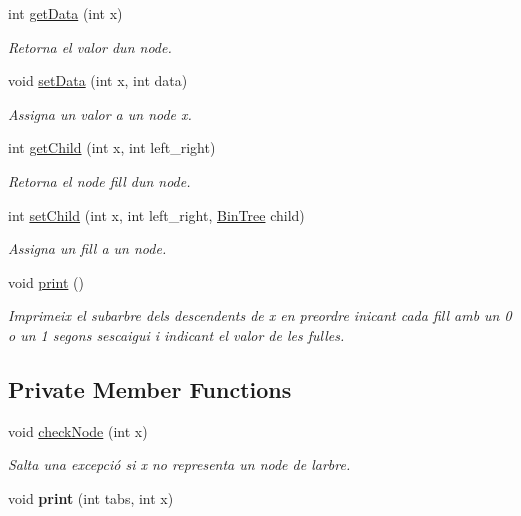\begin{DoxyCompactItemize}
int \hyperlink{classdomini_1_1utils_1_1BinTree_ad8734786aa8ba40815e4b782264aef64}{get\+Data} (int x)
\begin{DoxyCompactList}\small\item\em Retorna el valor d\textquotesingle{}un node. \end{DoxyCompactList}\item 
void \hyperlink{classdomini_1_1utils_1_1BinTree_a785c86fc21b251e2252455ab4ec2b3e1}{set\+Data} (int x, int data)
\begin{DoxyCompactList}\small\item\em Assigna un valor a un node x. \end{DoxyCompactList}\item 
int \hyperlink{classdomini_1_1utils_1_1BinTree_aee1ed36b9433869f94a6ee8a6815d872}{get\+Child} (int x, int left\+\_\+right)
\begin{DoxyCompactList}\small\item\em Retorna el node fill d\textquotesingle{}un node. \end{DoxyCompactList}\item 
int \hyperlink{classdomini_1_1utils_1_1BinTree_adbbdac6bb04a03f8f13c9152940ebbc6}{set\+Child} (int x, int left\+\_\+right, \hyperlink{classdomini_1_1utils_1_1BinTree}{Bin\+Tree} child)
\begin{DoxyCompactList}\small\item\em Assigna un fill a un node. \end{DoxyCompactList}\item 
void \hyperlink{classdomini_1_1utils_1_1BinTree_a0dc4daeb2d0e221cc8fc702d1d0ec795}{print} ()
\begin{DoxyCompactList}\small\item\em Imprimeix el subarbre dels descendents de x en preordre inicant cada fill amb un 0 o un 1 segons s\textquotesingle{}escaigui i indicant el valor de les fulles. \end{DoxyCompactList}\end{DoxyCompactItemize}
\subsection*{Private Member Functions}
\begin{DoxyCompactItemize}
\item 
void \hyperlink{classdomini_1_1utils_1_1BinTree_a32b3e2ad7dfee3425e0b1f6f8b5100f5}{check\+Node} (int x)
\begin{DoxyCompactList}\small\item\em Salta una excepció si x no representa un node de l\textquotesingle{}arbre. \end{DoxyCompactList}\item 
\mbox{\label{classdomini_1_1utils_1_1BinTree_a47c913594a3116b2e602c87fa4afc5c3}} 
void {\bfseries print} (int tabs, int x)
\end{DoxyCompactItemize}
